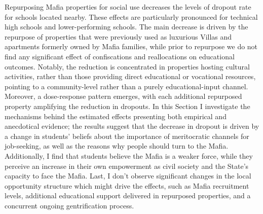 \documentclass[12pt]{article}
\theoremstyle{plain}
\theoremstyle{plain}
\theoremstyle{plain}
\theoremstyle{definition}
\theoremstyle{plain}
\theoremstyle{definition}
\theoremstyle{plain}
\theoremstyle{remark}
\theoremstyle{definition}
\theoremstyle{definition}
\theoremstyle{plain}
\begin{document}
Repurposing Mafia properties for social use decreases the levels of dropout rate for schools located nearby. These effects are particularly pronounced for technical high schools and lower-performing schools. The main decrease is driven by the repurpose of properties that were previously used as luxurious Villas and apartments formerly owned by Mafia families, while prior to repurpose we do not find any significant effect of confiscations and reallocations on educational outcomes.  Notably, the reduction is concentrated in properties hosting cultural activities, rather than those providing direct educational or vocational resources, pointing to a community-level rather than a purely educational-input channel. Moreover, a dose-response pattern emerges, with each additional repurposed property amplifying the reduction in dropouts.  In this Section I investigate the mechanisms behind the estimated effects presenting both empirical and anecdotical evidence; the results suggest that the decrease in dropout is driven by a change in students' beliefs about the importance of meritocratic channels for job-seeking, as well as the reasons why people should turn to the Mafia. Additionally, I find that students believe the Mafia is a weaker force, while they perceive an increase in their own empowerment as civil society and the State's capacity to face the Mafia. Last, I don't observe significant changes in the local opportunity structure which might drive the effects, such as Mafia recruitment levels, additional educational support delivered in repurposed properties, and a concurrent ongoing gentrification process.\par
\medskip
\end{document}
